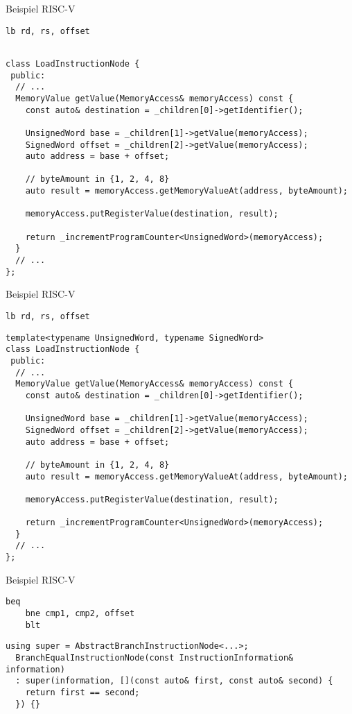 \begin{frame}[fragile]{Beispiel RISC-V}

\begin{lstlisting}[style=risc-v_Assembler]
    lb rd, rs, offset
\end{lstlisting}
\pause
\begin{lstlisting}[style=C++]

class LoadInstructionNode {
 public:
  // ...
  MemoryValue getValue(MemoryAccess& memoryAccess) const {
    const auto& destination = _children[0]->getIdentifier();

    UnsignedWord base = _children[1]->getValue(memoryAccess);
    SignedWord offset = _children[2]->getValue(memoryAccess);
    auto address = base + offset;

    // byteAmount in {1, 2, 4, 8}
    auto result = memoryAccess.getMemoryValueAt(address, byteAmount);

    memoryAccess.putRegisterValue(destination, result);

    return _incrementProgramCounter<UnsignedWord>(memoryAccess);
  }
  // ...
};
\end{lstlisting}
\end{frame}

\begin{frame}[fragile]{Beispiel RISC-V}
	
\begin{lstlisting}[style=risc-v_Assembler]
    lb rd, rs, offset
\end{lstlisting}
\begin{lstlisting}[style=C++]
template<typename UnsignedWord, typename SignedWord>
class LoadInstructionNode {
 public:
  // ...
  MemoryValue getValue(MemoryAccess& memoryAccess) const {
    const auto& destination = _children[0]->getIdentifier();

    UnsignedWord base = _children[1]->getValue(memoryAccess);
    SignedWord offset = _children[2]->getValue(memoryAccess);
    auto address = base + offset;

    // byteAmount in {1, 2, 4, 8}
    auto result = memoryAccess.getMemoryValueAt(address, byteAmount);

    memoryAccess.putRegisterValue(destination, result);

    return _incrementProgramCounter<UnsignedWord>(memoryAccess);
  }
  // ...
};
\end{lstlisting}
\end{frame}

\begin{frame}[fragile]{Beispiel RISC-V}
\begin{lstlisting}[style=risc-v_Assembler]
	beq
	bne cmp1, cmp2, offset
	blt
\end{lstlisting}
\begin{lstlisting}[style=C++]
using super = AbstractBranchInstructionNode<...>;
  BranchEqualInstructionNode(const InstructionInformation& information)
  : super(information, [](const auto& first, const auto& second) {
    return first == second;
  }) {}
\end{lstlisting}
\end{frame}
